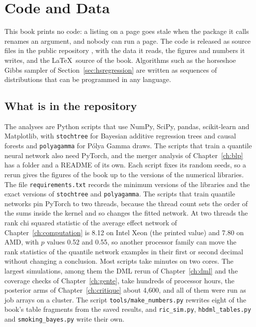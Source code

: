 \chapter{Code and Data}\label{app:code}

This book prints no code: a listing on a page goes stale when the package it calls renames an argument, and nobody can run a page. The code is released as source files in the public repository \coderepo, with the data it reads, the figures and numbers it writes, and the \LaTeX\ source of the book. Algorithms such as the horseshoe Gibbs sampler of Section~\ref{sec:hsregression} are written as sequences of distributions that can be programmed in any language.

\section{What is in the repository}

The analyses are Python scripts that use NumPy, SciPy, pandas, scikit-learn and Matplotlib, with \texttt{stochtree} for Bayesian additive regression trees and causal forests and \texttt{polyagamma} for P\'olya Gamma draws. The scripts that train a quantile neural network also need PyTorch, and the merger analysis of Chapter~\ref{ch:blp} has a folder and a README of its own. Each script fixes its random seeds, so a rerun gives the figures of the book up to the versions of the numerical libraries. The file \texttt{requirements.txt} records the minimum versions of the libraries and the exact versions of \texttt{stochtree} and \texttt{polyagamma}. The scripts that train quantile networks pin PyTorch to two threads, because the thread count sets the order of the sums inside the kernel and so changes the fitted network. At two threads the rank chi squared statistic of the average effect network of Chapter~\ref{ch:computation} is 8.12 on Intel Xeon (the printed value) and 7.80 on AMD, with $p$ values 0.52 and 0.55, so another processor family can move the rank statistics of the quantile network examples in their first or second decimal without changing a conclusion. Most scripts take minutes on two cores. The largest simulations, among them the DML rerun of Chapter~\ref{ch:dml} and the coverage checks of Chapter~\ref{ch:gente}, take hundreds of processor hours, the posterior arms of Chapter~\ref{ch:critique} about 4,600, and all of them were run as job arrays on a cluster. The script \texttt{tools/make\_numbers.py} rewrites eight of the book's table fragments from the saved results, and \texttt{ric\_sim.py}, \texttt{hbdml\_tables.py} and \texttt{smoking\_bayes.py} write their own.

